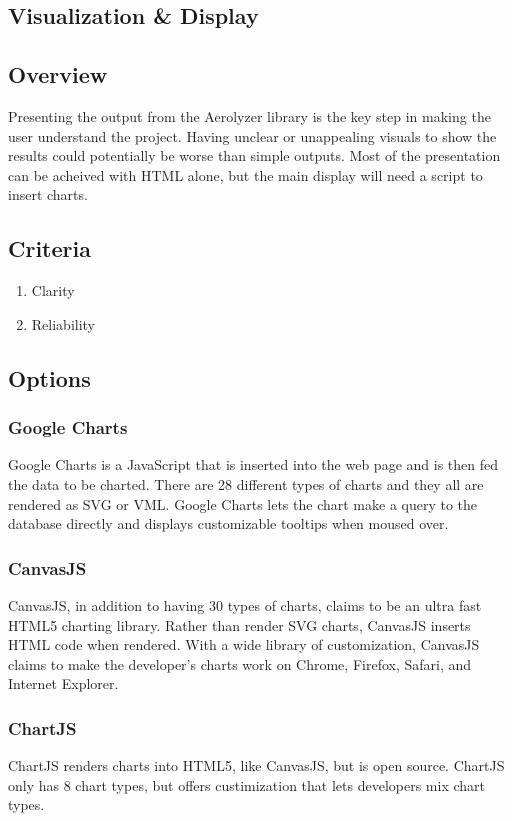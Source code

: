 \documentclass[onecolumn, draftclsnofoot,10pt, compsoc]{IEEEtran}
\begin{document}
\begin{singlespace}
\section{Visualization \& Display}
\subsection{Overview}
Presenting the output from the Aerolyzer library is the key step in making the user understand the project.
Having unclear or unappealing visuals to show the results could potentially be worse than simple outputs.
Most of the presentation can be acheived with HTML alone, but the main display will need a script to insert charts.
\subsection{Criteria}
\begin{enumerate}
	\item Clarity
	\item Reliability
\end{enumerate}
\subsection{Options}
\subsubsection{Google Charts}
Google Charts is a JavaScript that is inserted into the web page and is then fed the data to be charted.
There are 28 different types of charts and they all are rendered as SVG or VML.
Google Charts lets the chart make a query to the database directly and displays customizable tooltips when moused over.\cite{GoogleCh}
\subsubsection{CanvasJS}
CanvasJS, in addition to having 30 types of charts, claims to be an ultra fast HTML5 charting library.
Rather than render SVG charts, CanvasJS inserts HTML code when rendered.
With a wide library of customization, CanvasJS claims to make the developer's charts work on Chrome, Firefox, Safari, and Internet Explorer.\cite{CanvasJS}
\subsubsection{ChartJS}
ChartJS renders charts into HTML5, like CanvasJS, but is open source.
ChartJS only has 8 chart types, but offers custimization that lets developers mix chart types.\cite{ChartJS}

\end{singlespace}
\end{document}
